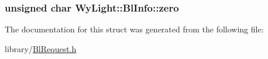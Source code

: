\hypertarget{struct_wy_light_1_1_bl_info_a824d4777a879a587bee8c68461226883}{
\subsubsection[{zero}]{\setlength{\rightskip}{0pt plus 5cm}unsigned char Wy\-Light\-::\-Bl\-Info\-::zero}}\label{struct_wy_light_1_1_bl_info_a824d4777a879a587bee8c68461226883}


The documentation for this struct was generated from the following file\-:\begin{DoxyCompactItemize}
\item 
library/\hyperlink{_bl_request_8h}{Bl\-Request.\-h}\end{DoxyCompactItemize}
